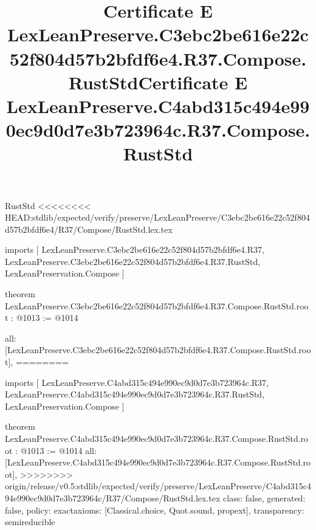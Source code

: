 \begin{lexlean}{RustStd}
<<<<<<<< HEAD:stdlib/expected/verify/preserve/LexLeanPreserve/C3ebc2be616e22c52f804d57b2bfdf6e4/R37/Compose/RustStd.lex.tex
\title{Certificate E LexLeanPreserve.C3ebc2be616e22c52f804d57b2bfdf6e4.R37.Compose.RustStd}
\begin{coremodule}
imports [
  LexLeanPreserve.C3ebc2be616e22c52f804d57b2bfdf6e4.R37,
  LexLeanPreserve.C3ebc2be616e22c52f804d57b2bfdf6e4.R37.RustStd,
  LexLeanPreservation.Compose
]

theorem LexLeanPreserve.C3ebc2be616e22c52f804d57b2bfdf6e4.R37.Compose.RustStd.root : @1013 := @1014 {
  all: [LexLeanPreserve.C3ebc2be616e22c52f804d57b2bfdf6e4.R37.Compose.RustStd.root],
========
\title{Certificate E LexLeanPreserve.C4abd315c494e990ec9d0d7e3b723964c.R37.Compose.RustStd}
\begin{coremodule}
imports [
  LexLeanPreserve.C4abd315c494e990ec9d0d7e3b723964c.R37,
  LexLeanPreserve.C4abd315c494e990ec9d0d7e3b723964c.R37.RustStd,
  LexLeanPreservation.Compose
]

theorem LexLeanPreserve.C4abd315c494e990ec9d0d7e3b723964c.R37.Compose.RustStd.root : @1013 := @1014 {
  all: [LexLeanPreserve.C4abd315c494e990ec9d0d7e3b723964c.R37.Compose.RustStd.root],
>>>>>>>> origin/release/v0.5:stdlib/expected/verify/preserve/LexLeanPreserve/C4abd315c494e990ec9d0d7e3b723964c/R37/Compose/RustStd.lex.tex
  class: false,
  generated: false,
  policy: exact{axioms: [Classical.choice, Quot.sound, propext]},
  transparency: semireducible
}


\end{coremodule}}
\end{coremodule}
\end{lexlean}
